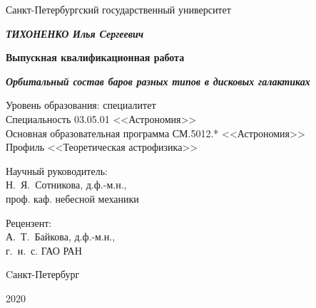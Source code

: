 \begin{titlepage}
  \centering
  {Санкт-Петербургский государственный университет \par}
  
  \vspace{2cm}

  {\bfseries \itshape\MakeUppercase{Тихоненко} Илья Сергеевич\par}
  \vspace{0.5\baselineskip}
  {\bfseries Выпускная квалификационная работа\par}
  \vspace{0.5\baselineskip}
  {\bfseries \itshape Орбитальный состав баров разных типов в дисковых галактиках\par}
  \vspace{2cm}
  {
    \begin{spacing}{1.0}
    Уровень образования: специалитет\\
    Специальность 03.05.01 <<Астрономия>>\\
    Основная образовательная программа СМ.5012.* <<Астрономия>>\\
    Профиль <<Теоретическая астрофизика>>
    \end{spacing}
  }
  \vspace{1cm}
  \begin{flushright}
    \singlespacing
    \parbox{0.5\textwidth}{
      {Научный руководитель:} \\
      Н.~Я.~Сотникова, д.ф.-м.н.,\\
      проф. каф. небесной механики\\
    }
  \end{flushright}
  \par
  \begin{flushright}
    \singlespacing
    \parbox{0.5\textwidth}{
    {Рецензент:} \\
      А.~Т.~Байкова, 
      д.ф.-м.н., \\
      г.~н.~с. ГАО РАН
      }
  \end{flushright}
  
  \vfill
  
  {Cанкт-Петербург \par}
  {2020}\\
\end{titlepage}
